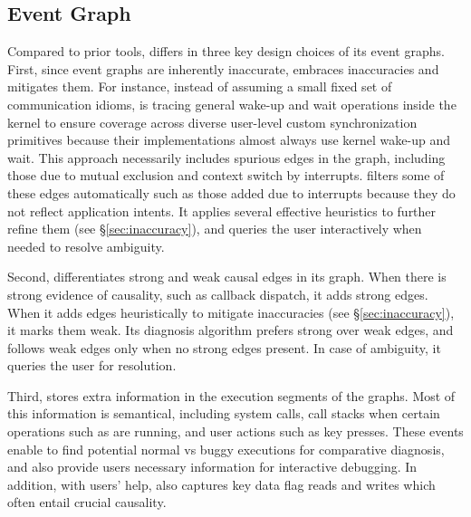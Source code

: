\subsection{\xxx Event Graph}\label{subsec:eventgraph}

Compared to prior tools, \xxx differs in three key design choices of its
event graphs.  First, since event graphs are inherently inaccurate, \xxx
embraces inaccuracies and mitigates them.  For instance, instead of
assuming a small fixed set of communication idioms, \xxx is tracing
general wake-up and wait operations inside the kernel to ensure coverage
across diverse user-level custom synchronization primitives because their
implementations almost always use kernel wake-up and wait.  This approach
necessarily includes spurious edges in the graph, including those due to
mutual exclusion and context switch by interrupts.  \xxx filters some of
these edges automatically such as those added due to interrupts because
they do not reflect application intents.  It applies several effective
heuristics to further refine them (see \S\ref{sec:inaccuracy}), and
queries the user interactively when needed to resolve ambiguity.

Second, \xxx differentiates strong and weak causal edges in its
graph. When there is strong evidence of causality, such as callback
dispatch, it adds strong edges.  When it adds edges heuristically to
mitigate inaccuracies (see \S\ref{sec:inaccuracy}), it marks them weak.
Its diagnosis algorithm prefers strong over weak edges, and follows weak
edges only when no strong edges present.  In case of ambiguity, it queries
the user for resolution.

Third, \xxx stores extra information in the execution segments of the
graphs. Most of this information is semantical, including system calls,
call stacks when certain operations such as  are running,
and user actions such as key presses. These events enable \xxx to find
potential normal vs buggy executions for comparative diagnosis, and also
provide users necessary information for interactive debugging.  In
addition, with users' help, \xxx also captures key data flag reads and
writes which often entail crucial causality.

